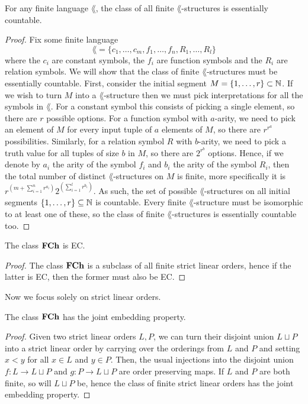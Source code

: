 \begin{prop}
  For any finite language $\lang$, the class of all finite $\lang$-structures is essentially
  countable.
\end{prop}
\begin{proof}
  Fix some finite language
  \begin{equation*}
    \lang = \{c_1, \dots, c_m, f_1, \dots, f_n, R_1, \dots, R_l \}
  \end{equation*}
  where the $c_i$ are constant symbols, the $f_i$ are function symbols and the $R_i$ are relation
  symbols. We will show that the class of finite $\lang$-structures must be essentially countable.
  First, consider the initial segment $M = \{1,\dots,r\} \subset \mathbb{N}$. If we wish to turn $M$ into a
  $\lang$-structure then we must pick interpretations for all the symbols in $\lang$. For a constant
  symbol this consists of picking a single element, so there are $r$ possible options. For a
  function symbol with $a$-arity, we need to pick an element of $M$ for every input tuple of $a$
  elements of $M$, so there are $r^{r^a}$ possibilities. Similarly, for a relation symbol $R$ with
  $b$-arity, we need to pick a truth value for all tuples of size $b$ in $M$, so there are $2^{r^b}$
  options. Hence, if we denote by $a_i$ the arity of the symbol $f_i$ and $b_i$ the arity of the
  symbol $R_i$, then the total number of distinct $\lang$-structures on $M$ is finite, more
  specifically it is
  $r^{\left(m + \sum_{i=1}^{n} r^{a_i}\right)}2^{\left(\sum_{i=1}^{l} r^{b_i}\right)}$.
  As such, the set of
  possible $\lang$-structures on all initial segments $\{1,\dots,r\} \subseteq \mathbb{N}$ is countable.
  Every finite $\lang$-structure must be isomorphic to at least one of these, so the class of finite
  $\lang$-structures is essentially countable too.
\end{proof}

\begin{cor}
  The class $\textbf{FCh}$ is EC.
\end{cor}
\begin{proof}
  The class $\textbf{FCh}$ is a subclass of all finite strict linear orders, hence if the latter is EC,
  then the former must also be EC.
\end{proof}

Now we focus solely on strict linear orders.

\begin{prop}
  The class $\textbf{FCh}$ has the joint embedding property.
\end{prop}
\begin{proof}
  Given two strict linear orders $L,P$, we can turn their disjoint union $L \sqcup P$ into a
  strict linear order by carrying over the orderings from $L$ and $P$ and setting
  $x < y$ for all $x \in L$ and $y \in P$. Then, the usual injections into the disjoint union
  $f : L \to L \sqcup P$ and $g : P \to L \sqcup P$ are order preserving maps. If
  $L$ and $P$ are both finite, so will $L \sqcup P$ be, hence the class of finite strict
  linear orders has the joint embedding property.
\end{proof}

